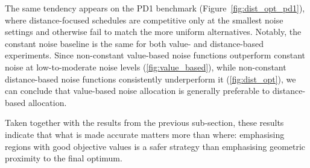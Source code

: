 {The same tendency appears on the PD1 benchmark (Figure~\ref{fig:dist_opt_pd1}), where distance-focused schedules are competitive only at the smallest noise settings and otherwise fail to match the more uniform alternatives. Notably, the constant noise baseline is the same for both value- and distance-based experiments. Since non-constant value-based noise functions outperform constant noise at low-to-moderate noise levels (\autoref{fig:value_based}), while non-constant distance-based noise functions consistently underperform it (\autoref{fig:dist_opt}), we can conclude that value-based noise allocation is generally preferable to distance-based allocation.

Taken together with the results from the previous sub-section, these results indicate that what is made accurate matters more than where: emphasising regions with good objective values is a safer strategy than emphasising geometric proximity to the final optimum.

}
